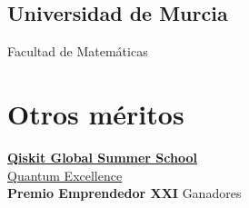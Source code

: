 \begin{minipage}[t]{0.25\textwidth}
		\subsection{Universidad de Murcia}
		Facultad de Matemáticas \\
		\sectionsep

		\section{Otros méritos}
		\href{https://www.credly.com/badges/dfb0ee71-da1d-4627-84e6-526c244d323d}{\textbf{Qiskit Global Summer School}\\ Quantum Excellence}
		\\
		\sectionsep
		{\textbf{Premio Emprendedor XXI}} Ganadores
		\\






	\end{minipage}
  \documentclass[]{article}